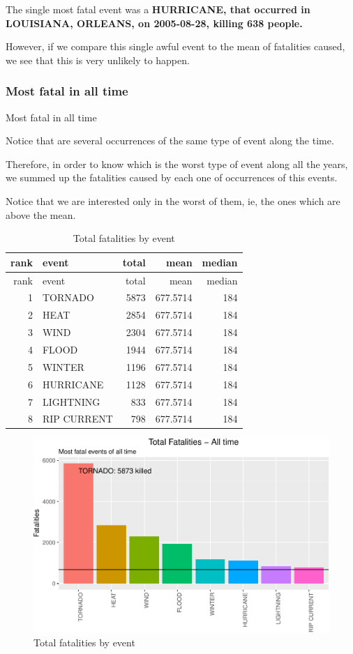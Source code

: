 \documentclass[]{article}
\begin{document}
The single most fatal event was a \textbf{HURRICANE, that occurred in
LOUISIANA, ORLEANS, on 2005-08-28, killing 638 people.}

However, if we compare this single awful event to the mean of fatalities
caused, we see that this is very unlikely to happen.

\subsubsection{Most fatal in all time}\label{most-fatal-in-all-time}

Most fatal in all time

Notice that are several occurrences of the same type of event along the
time.

Therefore, in order to know which is the worst type of event along all
the years, we summed up the fatalities caused by each one of occurrences
of this events.

Notice that we are interested only in the worst of them, ie, the ones
which are above the mean.

\begin{longtable}[]{@{}rlrrr@{}}
\caption{Total fatalities by event}\tabularnewline
\toprule
rank & event & total & mean & median\tabularnewline
\midrule
\endfirsthead
\toprule
rank & event & total & mean & median\tabularnewline
\midrule
\endhead
1 & TORNADO & 5873 & 677.5714 & 184\tabularnewline
2 & HEAT & 2854 & 677.5714 & 184\tabularnewline
3 & WIND & 2304 & 677.5714 & 184\tabularnewline
4 & FLOOD & 1944 & 677.5714 & 184\tabularnewline
5 & WINTER & 1196 & 677.5714 & 184\tabularnewline
6 & HURRICANE & 1128 & 677.5714 & 184\tabularnewline
7 & LIGHTNING & 833 & 677.5714 & 184\tabularnewline
8 & RIP CURRENT & 798 & 677.5714 & 184\tabularnewline
\bottomrule
\end{longtable}

\begin{figure}[htbp]
\centering
\includegraphics{readme_files/figure-latex/fatal-plot-alltime-1.pdf}
\caption{Total fatalities by event}
\end{figure}
\end{document}
